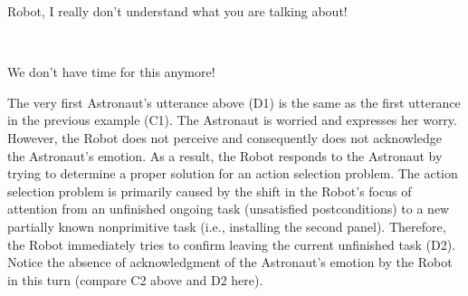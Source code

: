 \begin{description}
  \item \textit{\textbf{\fontsize{9pt}{12pt}\selectfont{D9. Astronaut:}}} Robot,
  I really don't understand what you are talking about!\\
  
  \item {}\\

  \item \textit{\textbf{\fontsize{9pt}{12pt}\selectfont{D11. Astronaut:}}} We
  don't have time for this anymore!
  
\end{description}

The very first Astronaut's utterance above (D1) is the same as the first
utterance in the previous example (C1). The Astronaut is worried and expresses
her worry. However, the Robot does not perceive and consequently does not
acknowledge the Astronaut's emotion. As a result, the Robot responds to the
Astronaut by trying to determine a proper solution for an action selection
problem. The action selection problem is primarily caused by the shift in the
Robot's focus of attention from an unfinished ongoing task (unsatisfied
postconditions) to a new partially known nonprimitive task (i.e., installing the
second panel). Therefore, the Robot immediately tries to confirm leaving the
current unfinished task (D2). Notice the absence of acknowledgment of the
Astronaut's emotion by the Robot in this turn (compare C2 above and D2 here).

